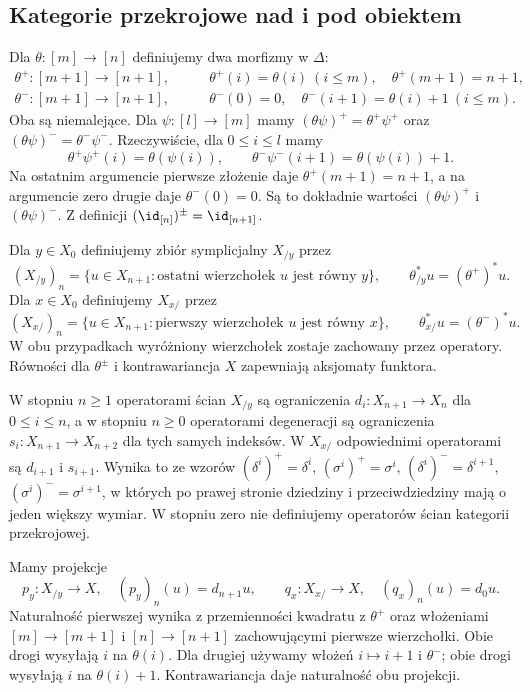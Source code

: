 \subsection{Kategorie przekrojowe nad i pod obiektem}

Dla $\theta:[m]\to[n]$ definiujemy dwa morfizmy w $\Delta$:
\[
\begin{aligned}
 \theta^+:[m+1]\to[n+1],&\qquad
 \theta^+(i)=\theta(i)\ (i\leq m),\quad
 \theta^+(m+1)=n+1,\\
 \theta^-:[m+1]\to[n+1],&\qquad
 \theta^-(0)=0,\quad
 \theta^-(i+1)=\theta(i)+1\ (i\leq m).
\end{aligned}
\]
Oba są niemalejące. Dla $\psi:[l]\to[m]$ mamy
$(\theta\psi)^+=\theta^+\psi^+$ oraz $(\theta\psi)^-=\theta^-\psi^-$. Rzeczywiście, dla $0\leq i\leq l$ mamy
\[
 \theta^+\psi^+(i)=\theta(\psi(i)),\qquad
 \theta^-\psi^-(i+1)=\theta(\psi(i))+1.
\]
Na ostatnim argumencie pierwsze złożenie daje $\theta^+(m+1)=n+1$, a na argumencie zero drugie daje $\theta^-(0)=0$. Są to dokładnie wartości $(\theta\psi)^+$ i $(\theta\psi)^-$. Z definicji $(\id_{[n]})^\pm=\id_{[n+1]}$.

\begin{definicja}\label{cat:def:quasicat-slices}
Dla $y\in X_0$ definiujemy zbiór symplicjalny $X_{/y}$ przez
\[
 (X_{/y})_n=\{u\in X_{n+1}:\text{ostatni wierzchołek }u
     \text{ jest równy }y\},\qquad
 \theta^*_{/y}u=(\theta^+)^*u .
\]
Dla $x\in X_0$ definiujemy $X_{x/}$ przez
\[
 (X_{x/})_n=\{u\in X_{n+1}:\text{pierwszy wierzchołek }u
     \text{ jest równy }x\},\qquad
 \theta^*_{x/}u=(\theta^-)^*u .
\]
W obu przypadkach wyróżniony wierzchołek zostaje zachowany przez operatory. Równości dla $\theta^\pm$ i kontrawariancja $X$ zapewniają aksjomaty funktora.
\end{definicja}
W stopniu $n\geq1$ operatorami ścian $X_{/y}$ są ograniczenia $d_i:X_{n+1}\to X_n$ dla $0\leq i\leq n$, a w stopniu $n\geq0$ operatorami degeneracji są ograniczenia $s_i:X_{n+1}\to X_{n+2}$ dla tych samych indeksów. W $X_{x/}$ odpowiednimi operatorami są $d_{i+1}$ i $s_{i+1}$. Wynika to ze wzorów $(\delta^i)^+=\delta^i$, $(\sigma^i)^+=\sigma^i$, $(\delta^i)^-=\delta^{i+1}$, $(\sigma^i)^-=\sigma^{i+1}$, w których po prawej stronie dziedziny i przeciwdziedziny mają o jeden większy wymiar. W stopniu zero nie definiujemy operatorów ścian kategorii przekrojowej.

Mamy projekcje
\[
 p_y:X_{/y}\to X,\quad (p_y)_n(u)=d_{n+1}u,
 \qquad
 q_x:X_{x/}\to X,\quad(q_x)_n(u)=d_0u.
\]
Naturalność pierwszej wynika z przemienności kwadratu z $\theta^+$ oraz włożeniami $[m]\to[m+1]$ i $[n]\to[n+1]$ zachowującymi pierwsze wierzchołki. Obie drogi wysyłają $i$ na $\theta(i)$. Dla drugiej używamy włożeń $i\mapsto i+1$ i $\theta^-$; obie drogi wysyłają $i$ na $\theta(i)+1$. Kontrawariancja daje naturalność obu projekcji.

